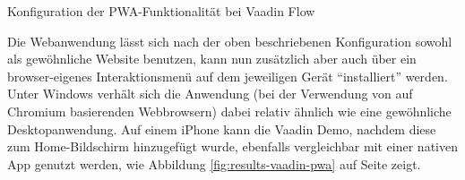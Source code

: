 \documentclass[a4paper,12pt,twoside]{scrreprt}
\begin{document}
\begin{listing}[ht]
    \inputminted[fontsize=\footnotesize,linenos,breaklines]{java}{code/Luidold_Results-Vaadin-PWA.java}
    \caption[Konfiguration der \ac{PWA}-Funktionalität bei Vaadin Flow]{Konfiguration der \ac{PWA}-Funktionalität bei Vaadin Flow}
    \label{code:results-vaadin-pwa}
\end{listing}

Die Webanwendung lässt sich nach der oben beschriebenen Konfiguration sowohl als gewöhnliche Website benutzen, kann nun zusätzlich aber auch über ein browser-eigenes Interaktionsmenü auf dem jeweiligen Gerät \enquote{installiert} werden. Unter Windows verhält sich die Anwendung (bei der Verwendung von auf Chromium basierenden Webbrowsern) dabei relativ ähnlich wie eine gewöhnliche Desktopanwendung. Auf einem iPhone kann die Vaadin Demo, nachdem diese zum Home-Bildschirm hinzugefügt wurde, ebenfalls vergleichbar mit einer nativen App genutzt werden, wie Abbildung \ref{fig:results-vaadin-pwa} auf Seite \pageref{fig:results-vaadin-pwa} zeigt.
\end{document}

